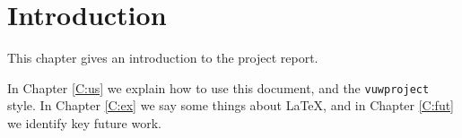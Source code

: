 \chapter{Introduction}\label{C:intro}
This chapter gives an introduction to the project report.

In Chapter \ref{C:us} we explain how to use this document, and the \texttt{vuwproject} style. In Chapter \ref{C:ex} we say some things about \LaTeX, and in Chapter \ref{C:fut} we identify key future work.